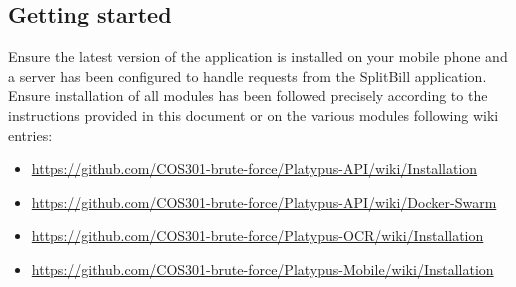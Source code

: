 \documentclass[12pt,a4paper]{article}
\begin{document}
    
\subsection{Getting started}
Ensure the latest version of the application is installed on your mobile phone and a server has been configured to handle requests from the SplitBill application. Ensure installation of all modules has been followed precisely according to the instructions provided in this document or on the various modules following wiki entries: 
\begin{itemize}
\item \url{https://github.com/COS301-brute-force/Platypus-API/wiki/Installation}
\item \url{https://github.com/COS301-brute-force/Platypus-API/wiki/Docker-Swarm} 
\item \url{https://github.com/COS301-brute-force/Platypus-OCR/wiki/Installation} 
\item \url{https://github.com/COS301-brute-force/Platypus-Mobile/wiki/Installation}
\end{itemize}
\end{document}
